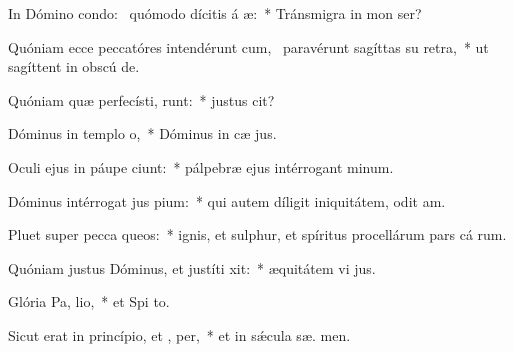 \item In Dómino condo:~\pscross{} quómodo dícitis á æ:~* Tránsmigra in mon  ser?
\item Quóniam ecce peccatóres intendérunt cum,~\pscross{} paravérunt sagíttas su  retra,~* ut sagíttent in obscú  de.
\item Quóniam quæ perfecísti, runt:~* justus   cit?
\item Dóminus in templo  o,~* Dóminus in cæ  jus.
\item Oculi ejus in páupe ciunt:~* pálpebræ ejus intérrogant  minum.
\item Dóminus intérrogat jus  pium:~* qui autem díligit iniquitátem, odit  am.
\item Pluet super pecca queos:~* ignis, et sulphur, et spíritus procellárum pars cá rum.
\item Quóniam justus Dóminus, et justíti xit:~* æquitátem vi  jus.
\item Glória Pa,  lio,~* et Spi to.
\item Sicut erat in princípio, et ,  per,~* et in sǽcula sæ. men.
